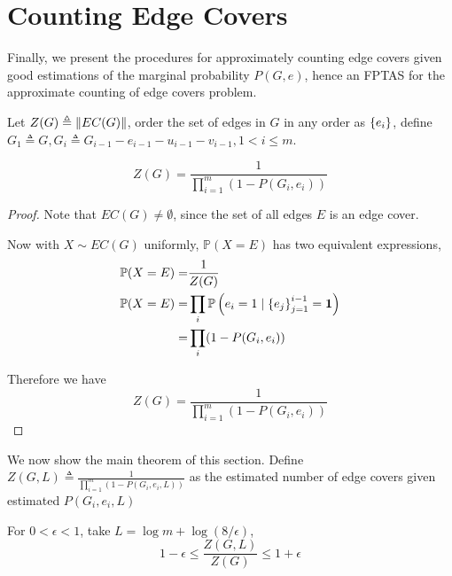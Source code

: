 \section{Counting Edge Covers}

Finally, we present the procedures for approximately counting edge covers given good estimations of the marginal probability $P(G,e)$, hence an FPTAS for the approximate counting of edge covers problem.

\begin{Prop}
	
	Let $Z(G) \triangleq \left\Vert EC(G)\right\Vert$, order the set of edges in $G$ in any order as $\left\{e_i\right\}$, define $G_1 \triangleq G, G_i \triangleq G_{i-1} - e_{i-1} - u_{i-1} - v_{i-1}, 1 < i \leq m $.

	\[ Z(G) = \frac{1}{\prod_{i=1}^m (1 - P(G_i, e_i))} \]

\end{Prop}

\begin{proof}
	Note that $EC(G) \neq \emptyset$, since the set of all edges $E$ is an edge cover.

	Now with $X \sim EC(G)$ uniformly, $\mathbb{P}(X=E)$ has two equivalent expressions,
	\begin{align*}
		\mathbb{P} (X = E) =& \frac{1}{Z(G)} \\
		\mathbb{P} (X = E) =& \prod_i \mathbb{P} \left(e_i = 1 \mid \left\{e_j\right\}_{j=1}^{i-1} = \mathbf{1} \right) \\
		=&\prod_i (1- P(G_i, e_i))
	\end{align*}

	Therefore we have
	\[ Z(G) = \frac{1}{\prod_{i=1}^m (1 - P(G_i, e_i))} \]
\end{proof}

We now show the main theorem of this section.
Define $Z(G, L) \triangleq \frac{1}{\prod_{i=1}^m (1 - P(G_i, e_i, L))}$ as the estimated number of edge covers given estimated $P(G_i, e_i, L)$

\begin{Thm}
	For $0< \epsilon <1$, take $L=\log m + \log(8/ \epsilon) $,
	\[ 1- \epsilon \leq \frac{Z(G, L)}{Z(G)} \leq 1+ \epsilon\]
\end{Thm}

